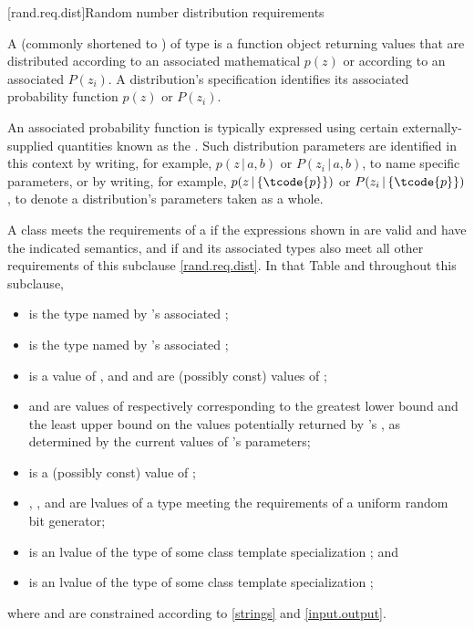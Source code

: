 
[rand.req.dist]{Random number distribution requirements}%
%

\pnum
A 
(commonly shortened to )
 of type 
is a function object
returning values
that are distributed according to
an associated mathematical 
$p(z)$
or according to
an associated 
$P(z_i)$.
A distribution's specification
identifies its associated probability function
$p(z)$ or $P(z_i)$.

\pnum
An associated probability function is typically expressed
using certain externally-supplied quantities
known as the .
Such distribution parameters are identified
in this context by writing, for example,
  $p(z\,|\,a,b)$ or $P(z_i\,|\,a,b)$,
  to name specific parameters,
or by writing, for example,
  $p(z\,|\left\{\tcode{p}\right\})$
  or $P(z_i\,|\left\{\tcode{p}\right\})$,
  to denote a distribution's parameters  taken as a whole.

\pnum
A class 
meets the requirements
of a 
if the expressions shown
in 
are valid and have the indicated semantics,
and if  and its associated types
also meet all other requirements
of this subclause \ref{rand.req.dist}.
In that Table and throughout this subclause,
\begin{itemize}
  \item
     is the type named by
    's associated ;
  \item
     is the type named by
    's associated ;
  \item
     is a
    value of ,
    and
     and  are (possibly const) values of ;
  \item
     and 
    are values of 
    respectively corresponding to
    the greatest lower bound and the least upper bound
    on the values potentially returned by 's ,
    as determined by the current values of 's parameters;
  \item
     is a (possibly const) value of ;
  \item
    , , and  are lvalues of a type
    meeting the requirements
    of a uniform random bit generator;
  \item
     is an lvalue of the type of some class template specialization
     ;
  and
  \item
     is an lvalue of the type of some class template specialization
     ;
\end{itemize}
where  and  are constrained
according to \ref{strings} and \ref{input.output}.

